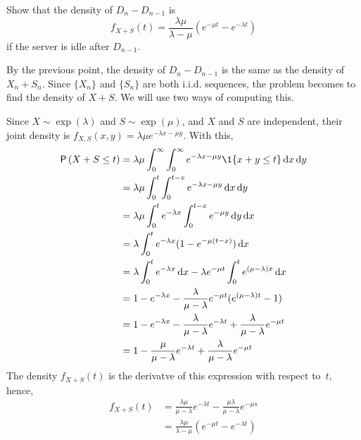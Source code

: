 \begin{exercise}
Show that the density of $D_{n} - D_{n-1}$ is
    \begin{equation*}
    f_{X+S}(t) = \frac{\lambda \mu}{\lambda - \mu} (e^{-\mu t} - e^{-\lambda t})
    \end{equation*}
if the server is idle after $D_{n-1}$.
    \begin{solution}
      By the previous point, the density of $D_{n} - D_{n-1}$ is the
      same as the density of $X_n + S_n$.  Since $\{X_n\}$ and $\{S_n\}$ are both i.i.d. sequences, the problem becomes to find the density of $X+S$.  We will use two ways of computing this. 

\newpage
Since $X\sim \exp(\lambda)$ and $S\sim\exp(\mu)$, and $X$ and $S$ are independent, their joint density is $f_{X,S}(x,y) = \lambda \mu e^{-\lambda x - \mu y}$. With this,
  \begin{align*}
\P{X+S\leq t } 
&= \lambda \mu \int_0^\infty \int_0^\infty e^{-\lambda x - \mu y} \1{x+y\leq t} \d x \d y \\
&= \lambda \mu \int_0^t \int_0^{t-x} e^{-\lambda x - \mu y} \d x \d y \\
&= \lambda \mu \int_0^t e^{-\lambda x} \int_0^{t-x} e^{- \mu y} \d y \d x \\
&= \lambda \int_0^t e^{-\lambda x} (1-e^{- \mu (t-x)} ) \d x  \\
&= \lambda \int_0^t e^{-\lambda x}  \d x - \lambda e^{-\mu t} \int_0^t e^{(\mu-\lambda) x} \d x \\
&= 1- e^{-\lambda x} - \frac{\lambda}{\mu-\lambda} e^{-\mu t} ( e^{(\mu-\lambda) t} -1) \\
&= 1- e^{-\lambda x} - \frac{\lambda}{\mu-\lambda} e^{-\lambda t} + \frac{\lambda}{\mu-\lambda} e^{-\mu t} \\ 
&= 1 - \frac{\mu}{\mu-\lambda} e^{-\lambda t} + \frac{\lambda}{\mu-\lambda} e^{-\mu t} \\
  \end{align*}
The density $f_{X+S}(t)$ is the derivatve of this expression with respect to~$t$, hence,
\begin{align*}
  f_{X+S}(t) 
&= \frac{\lambda\mu}{\mu-\lambda} e^{-\lambda t}  - \frac{\mu \lambda}{\mu-\lambda} e^{-\mu s} \\
&= \frac{\lambda\mu}{\lambda -\mu}(e^{-\mu t} - e^{-\lambda t}) \\
\end{align*}


\end{solution}
\end{exercise}
